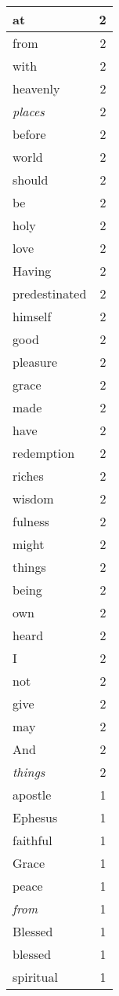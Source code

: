 \begin{center}
\begin{longtable}{l|r}
at & 2\\ \hline 
from & 2\\ \hline 
with & 2\\ \hline 
heavenly & 2\\ \hline 
\emph{places} & 2\\ \hline 
before & 2\\ \hline 
world & 2\\ \hline 
should & 2\\ \hline 
be & 2\\ \hline 
holy & 2\\ \hline 
love & 2\\ \hline 
Having & 2\\ \hline 
predestinated & 2\\ \hline 
himself & 2\\ \hline 
good & 2\\ \hline 
pleasure & 2\\ \hline 
grace & 2\\ \hline 
made & 2\\ \hline 
have & 2\\ \hline 
redemption & 2\\ \hline 
riches & 2\\ \hline 
wisdom & 2\\ \hline 
fulness & 2\\ \hline 
might & 2\\ \hline 
things & 2\\ \hline 
being & 2\\ \hline 
own & 2\\ \hline 
heard & 2\\ \hline 
I & 2\\ \hline 
not & 2\\ \hline 
give & 2\\ \hline 
may & 2\\ \hline 
And & 2\\ \hline 
\emph{things} & 2\\ \hline 
apostle & 1\\ \hline 
Ephesus & 1\\ \hline 
faithful & 1\\ \hline 
Grace & 1\\ \hline 
peace & 1\\ \hline 
\emph{from} & 1\\ \hline 
Blessed & 1\\ \hline 
blessed & 1\\ \hline 
spiritual & 1\\ \hline 

\end{longtable}
\end{center}
